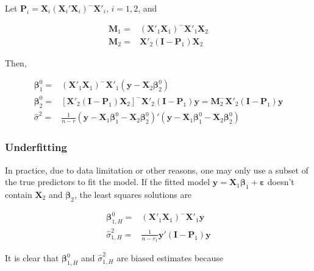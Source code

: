 \documentclass[
  11pt,
  openany]{memoir}
\begin{document}
Let \(\mathbf{P}_i=\mathbf{X}_i(\mathbf{X}_i'\mathbf{X}_i)^{-}\mathbf{X}'_i\), \(i=1,2\), and

\begin{equation}
\begin{split}
\mathbf{M}_1=&(\mathbf{X}'_1\mathbf{X}_1)^{-}\mathbf{X}'_1\mathbf{X}_2\\
\mathbf{M}_2=&\mathbf{X}'_2(\mathbf{I}-\mathbf{P}_1)\mathbf{X}_2
\end{split}
\end{equation}

Then,

\begin{equation}
\begin{split}
\boldsymbol\beta^0_1=&(\mathbf{X}'_1\mathbf{X}_1)^{-}\mathbf{X}'_1(\mathbf{y}-\mathbf{X}_2\boldsymbol\beta^0_2)\\
\boldsymbol\beta^0_2=&[\mathbf{X}'_2(\mathbf{I}-\mathbf{P}_1)\mathbf{X}_2]^{-}\mathbf{X}'_2(\mathbf{I}-\mathbf{P}_1)\mathbf{y}=\mathbf{M}^{-}_2\mathbf{X}'_2(\mathbf{I}-\mathbf{P}_1)\mathbf{y}\\
\hat\sigma^2=&\frac{1}{n-r}(\mathbf{y}-\mathbf{X}_1\boldsymbol\beta^0_1-\mathbf{X}_2\boldsymbol\beta^0_2)'(\mathbf{y}-\mathbf{X}_1\boldsymbol\beta^0_1-\mathbf{X}_2\boldsymbol\beta^0_2)
\end{split}
\end{equation}

\hypertarget{underfitting}{%
\subsubsection{Underfitting}\label{underfitting}}

In practice, due to data limitation or other reasons, one may only use a subset of the true predictors to fit the model.
If the fitted model \(\mathbf{y}=\mathbf{X}_1\boldsymbol\beta_1 + \boldsymbol\varepsilon\) doesn't contain \(\mathbf{X}_2\) and \(\boldsymbol\beta_2\), the least squares solutions are

\begin{equation}
\begin{split}
\boldsymbol\beta^0_{1,H}=&(\mathbf{X}'_1\mathbf{X}_1)^{-}\mathbf{X}'_1\mathbf{y}\\
\hat\sigma^2_{1,H}=&\frac{1}{n-r_1}\mathbf{y}'(\mathbf{I}-\mathbf{P}_1)\mathbf{y}
\end{split}
\end{equation}

It is clear that \(\boldsymbol\beta^0_{1,H}\) and \(\hat\sigma^2_{1,H}\) are biased estimates because
\end{document}
